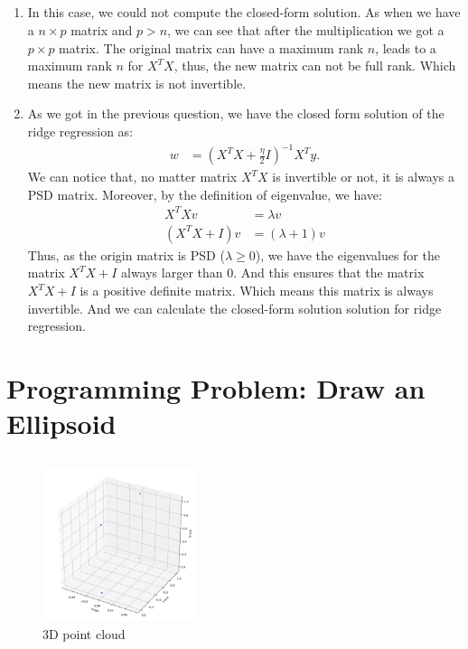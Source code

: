 \documentclass{article}
\begin{document}
\subsection{}
\begin{enumerate}
    \item In this case, we could not compute the closed-form solution. As when we have a $ n\times p  $ matrix and $ p > n $, we can see that after the multiplication we got a $ p\times p $ matrix. The original matrix can have a maximum rank $ n $, leads to a maximum rank $ n $ for $ X^TX $, thus, the new matrix can not be full rank. Which means the new matrix is not invertible.
    \item As we got in the previous question, we have the closed form solution of the ridge regression as:
    \begin{align*}
            w&= (X^TX+\frac{\eta}{2}I)^{-1}X^Ty.
    \end{align*}
    We can notice that, no matter matrix $ X^TX $ is invertible or not, it is always a PSD matrix. Moreover, by the definition of eigenvalue, we have:
    \begin{align*}
        X^TXv &= \lambda v\\
        (X^TX + I)v &= (\lambda + 1) v
    \end{align*}
    Thus, as the origin matrix is PSD ($ \lambda \geq 0 $), we have the eigenvalues for the matrix $ X^TX + I $ always larger than 0. And this ensures that the matrix $ X^TX + I $ is a positive definite matrix. Which means this matrix is always invertible. And we can calculate the closed-form solution solution for ridge regression.
    \clearpage
\end{enumerate}
\section{Programming Problem: Draw an Ellipsoid}\label{sec:Programming Problem: Draw an Ellipsoid} %
\subsection{}
\begin{figure}[htbp]
    \begin{center}
        \includegraphics[width=0.4\textwidth]{./figure/ellipsoid_f1.pdf}
    \end{center}
    \caption{3D point cloud}\label{fig:}
\end{figure}
\end{document}
